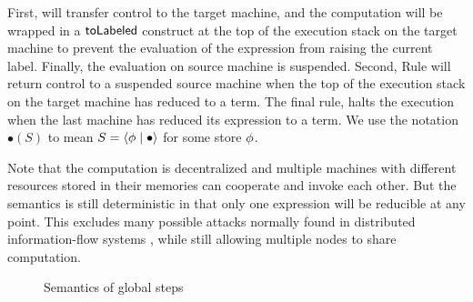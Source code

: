 First,  will transfer control to the target machine, and the computation will be wrapped in a $\mathsf{toLabeled}$ construct at the top of the execution stack on the target machine to prevent the evaluation of the expression from raising the current label. Finally, the evaluation on source machine is suspended. Second, Rule  will return control to a suspended source machine when the top of the execution stack on the target machine has reduced to a term. The final rule,  halts the execution when the last machine has reduced its expression to a term. We use the notation $\bullet(S)$ to mean $S = \langle \phi \mid \bullet \rangle$ for some store $\phi$.

Note that the computation is decentralized and multiple machines with different resources stored in their memories can cooperate and invoke each other. But the semantics is still deterministic in that only one expression will be reducible at any point. This excludes many possible attacks normally found in distributed information-flow systems \cite{Cite attacks on concurrent and distributed systems} , while still allowing multiple nodes to share computation.

\begin{figure*}
\centering
{}
\caption{Semantics of global steps}
\label{fig:global-steps}
\end{figure*}

